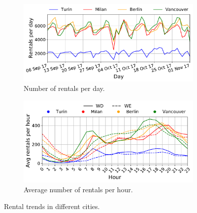\begin{figure}[t]
    \begin{center}
        \begin{subfigure}{\textwidth}
            \includegraphics[width=\columnwidth]{figures/bookings_per_day.pdf}
            \caption{Number of rentals per day.}
            \label{fig:rentals_per_day}
        \end{subfigure}
         \begin{subfigure}{\textwidth}
             \includegraphics[width=\columnwidth]{figures/aggBookginfsPerHour.pdf}
             \caption{Average number of rentals per hour.}
             \label{fig:rentals_per_hour}
         \end{subfigure}
         \caption{Rental trends in different cities.}
         \label{fig:rentals_trends}
\end{center}
\end{figure}


